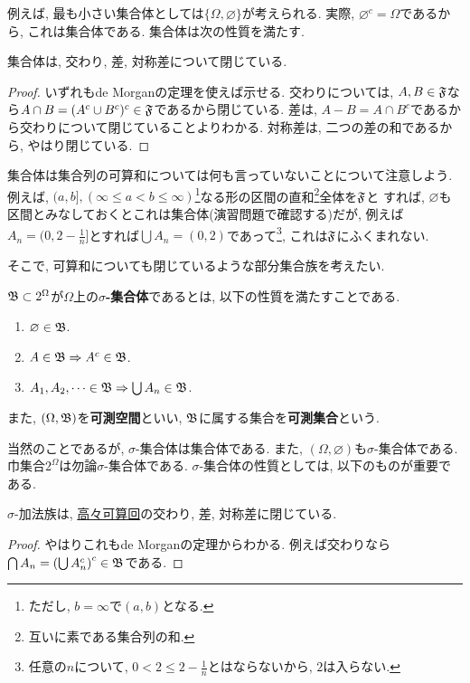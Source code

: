         例えば, 最も小さい集合体としては$\{\Omega,\varnothing\}$が考えられる. 実際, $\varnothing^c = \Omega$であるから, これは集合体である.
        集合体は次の性質を満たす.

        \begin{theorem}
            集合体は, 交わり, 差, 対称差について閉じている.
        \end{theorem}
        \begin{proof}
            いずれもde Morganの定理を使えば示せる. 交わりについては, $A,B\in\mathfrak{F}$なら$A\cap B = (A^c \cup B^c)^c\in \mathfrak{F}$であるから閉じている.
            差は, $A-B=A\cap B^c$であるから交わりについて閉じていることよりわかる. 対称差は, 二つの差の和であるから, やはり閉じている.
        \end{proof}

        集合体は集合列の可算和については何も言っていないことについて注意しよう. 例えば, $(a,b],(\infty\leq a<b\leq \infty)$\footnote{ただし, $b=\infty$で$(a,b)$となる.}なる形の区間の直和\footnote{互いに素である集合列の和.}全体を$\mathfrak{F}$と
        すれば, $\varnothing$も区間とみなしておくとこれは集合体(演習問題で確認する)だが, 例えば$A_n=(0,2-\frac{1}{n}]$とすれば$\bigcup A_n = (0,2)$であって\footnote{任意の$n$について, $0<2\leq 2-\frac{1}{n}$とはならないから, $2$は入らない.}, これは$\mathfrak{F}$にふくまれない.
        \clearpage
        
        そこで, 可算和についても閉じているような部分集合族を考えたい.
        \begin{definition}
            $\mathfrak{B}\subset 2^\Omega$が$\Omega$上の\textbf{$\sigma$-集合体}であるとは, 以下の性質を満たすことである.
            \begin{enumerate}
                \item $\varnothing\in\mathfrak{B}$.
                \item $A\in\mathfrak{B}\Rightarrow A^c\in\mathfrak{B}$.
                \item $A_1,A_2,\dots\in\mathfrak{B}\Rightarrow \bigcup A_n\in\mathfrak{B}$.
            \end{enumerate}
            また, $(\Omega,\mathfrak{B})$を\textbf{可測空間}といい, $\mathfrak{B}$に属する集合を\textbf{可測集合}という.
        \end{definition}

        当然のことであるが, $\sigma$-集合体は集合体である. また, $(\Omega,\varnothing)$も$\sigma$-集合体である. 巾集合$2^\Omega$は勿論$\sigma$-集合体である.
        $\sigma$-集合体の性質としては, 以下のものが重要である.
        \begin{theorem}
            $\sigma$-加法族は, \underline{高々可算回}の交わり, 差, 対称差に閉じている.
        \end{theorem}
        \begin{proof}
            やはりこれもde Morganの定理からわかる. 例えば交わりなら$\bigcap A_n = \left(\bigcup A_n^c\right)^c \in \mathfrak{B}$である.
        \end{proof}


